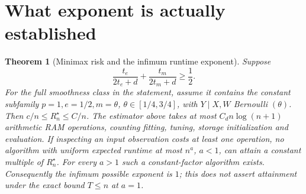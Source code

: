 \documentclass[11pt]{article}
\newtheorem{theorem}{Theorem}
\theoremstyle{remark}
\begin{document}
\section{What exponent is actually established}
\begin{theorem}[Minimax risk and the infimum runtime exponent]
Suppose
\[
 \frac{t_e}{2t_e+d}+\frac{t_m}{2t_m+d}\geq\frac12. \tag{*}
\]
For the full smoothness class in the statement, assume it contains the
constant subfamily $p=1,e=1/2,m=\theta$, $\theta\in[1/4,3/4]$,
with $Y\mid X,W$ Bernoulli $(\theta)$. Then
$c/n\leq R_n^\star\leq C/n$.
The estimator above takes at most $C_d n\log(n+1)$ arithmetic RAM
operations, counting fitting, tuning, storage initialization and evaluation.
If inspecting an input observation costs at least one operation, no
algorithm with uniform expected runtime at most $n^a$, $a<1$, can attain
a constant multiple of $R_n^\star$. For every $a>1$ such a constant-factor
algorithm exists. Consequently the infimum possible exponent is $1$;
this does not assert attainment under the exact bound $T\leq n$ at $a=1$.
\end{theorem}
\end{document}
